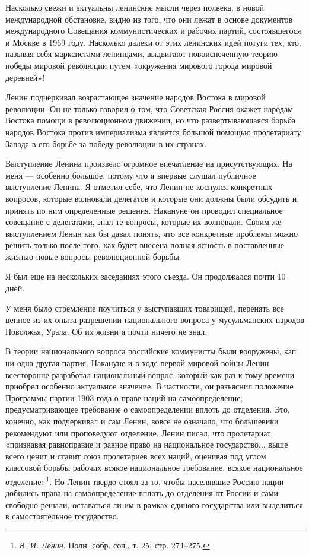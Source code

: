 \documentclass[12pt, a4paper, openany]{book}
\begin{document}
Насколько свежи и актуальны ленинские мысли через полвека, в новой международной обстановке, видно из того, что они лежат в основе документов международного Совещания коммунистических и рабочих партий, состоявшегося и Москве в 1969 году. Насколько далеки от этих ленинских идей потуги тех, кто, называя себя марксистами-ленинцами, выдвигают новоиспеченную теорию победы мировой революции путем «окружения мирового города мировой деревней»!

Ленин подчеркивал возрастающее значение народов Востока в мировой революции. Он не только говорил о том, что Советская Россия окажет народам Востока помощи в революционном движении, но что развертывающаяся борьба народов Востока против империализма является большой помощью пролетариату Запада в его борьбе за победу революции в их странах.

Выступление Ленина произвело огромное впечатление на присутствующих. На меня — особенно большое, потому что я впервые слушал публичное выступление Ленина. Я отметил себе, что Ленин не коснулся конкретных вопросов, которые волновали делегатов и которые они должны были обсудить и принять по ним определенные решения. Накануне он проводил специальное совещание с делегатами, знал те вопросы, которые их волновали. Своим же выступлением Ленин как бы давал понять, что все конкретные проблемы можно решить только после того, как будет внесена полная ясность в поставленные жизнью новые вопросы революционной борьбы.

Я был еще на нескольких заседаниях этого съезда. Он продолжался почти 10 дней.

У меня было стремление поучиться у выступавших товарищей, перенять все ценное из их опыта разрешении национального вопроса у мусульманских народов Поволжья, Урала. Об их жизни я почти ничего не знал.

В теории национального вопроса российские коммунисты были вооружены, кап ни одна другая партия. Накануне и в ходе первой мировой войны Ленин всесторонне разработал национальный вопрос, который как раз к тому времени приобрел особенно актуальное значение. В частности, он разъяснил положение Программы партии 1903 года о праве наций на самоопределение, предусматривающее требование о самоопределении вплоть до отделения. Это, конечно, как подчеркивал и сам Ленин, вовсе не означало, что большевики рекомендуют или проповедуют отделение. Ленин писал, что пролетариат, «признавая равноправие и равное право на национальное государство... выше всего ценит и ставит союз пролетариев всех наций, оценивая под углом классовой борьбы рабочих всякое национальное требование, всякое национальное отделение»\footnote{\textit{В. И. Ленин}. Полн. собр. соч., т. 25, стр. 274–275.}. Но Ленин твердо стоял за то, чтобы населявшие Россию нации добились права на самоопределение вплоть до отделения от России и сами свободно решали, оставаться ли им в рамках единого государства или выделиться в самостоятельное государство.
\end{document}
